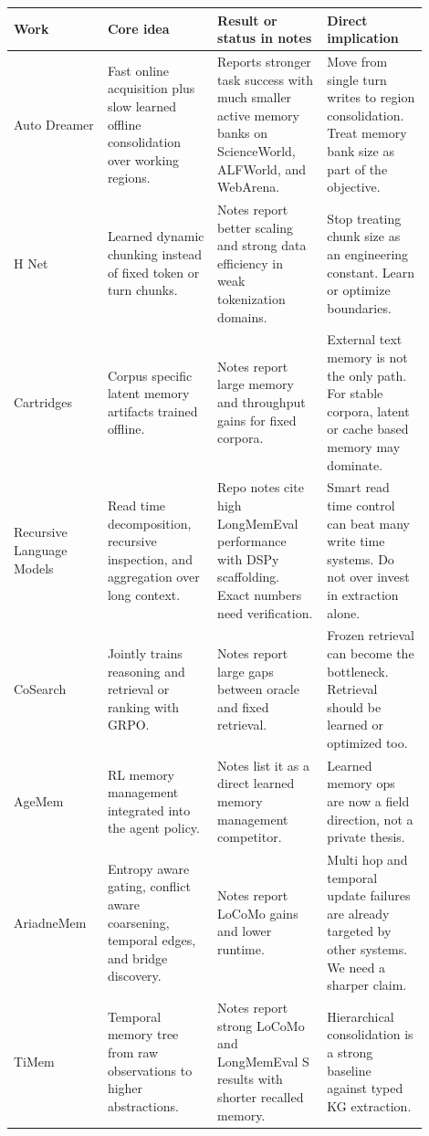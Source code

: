 \documentclass[11pt]{article}
\begin{document}
\begin{longtable}{p{0.20\linewidth} p{0.24\linewidth} p{0.24\linewidth} p{0.22\linewidth}}
\toprule
Work & Core idea & Result or status in notes & Direct implication \\
\midrule
Auto Dreamer & Fast online acquisition plus slow learned offline consolidation over working regions. & Reports stronger task success with much smaller active memory banks on ScienceWorld, ALFWorld, and WebArena. & Move from single turn writes to region consolidation. Treat memory bank size as part of the objective. \\
H Net & Learned dynamic chunking instead of fixed token or turn chunks. & Notes report better scaling and strong data efficiency in weak tokenization domains. & Stop treating chunk size as an engineering constant. Learn or optimize boundaries. \\
Cartridges & Corpus specific latent memory artifacts trained offline. & Notes report large memory and throughput gains for fixed corpora. & External text memory is not the only path. For stable corpora, latent or cache based memory may dominate. \\
Recursive Language Models & Read time decomposition, recursive inspection, and aggregation over long context. & Repo notes cite high LongMemEval performance with DSPy scaffolding. Exact numbers need verification. & Smart read time control can beat many write time systems. Do not over invest in extraction alone. \\
CoSearch & Jointly trains reasoning and retrieval or ranking with GRPO. & Notes report large gaps between oracle and fixed retrieval. & Frozen retrieval can become the bottleneck. Retrieval should be learned or optimized too. \\
AgeMem & RL memory management integrated into the agent policy. & Notes list it as a direct learned memory management competitor. & Learned memory ops are now a field direction, not a private thesis. \\
AriadneMem & Entropy aware gating, conflict aware coarsening, temporal edges, and bridge discovery. & Notes report LoCoMo gains and lower runtime. & Multi hop and temporal update failures are already targeted by other systems. We need a sharper claim. \\
TiMem & Temporal memory tree from raw observations to higher abstractions. & Notes report strong LoCoMo and LongMemEval S results with shorter recalled memory. & Hierarchical consolidation is a strong baseline against typed KG extraction. \\

\end{longtable}
\end{document}
